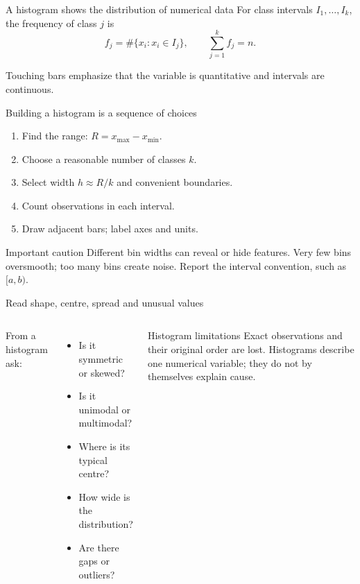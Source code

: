 \documentclass[aspectratio=169,11pt]{beamer}
\begin{document}
\begin{frame}{A histogram shows the distribution of numerical data}
For class intervals $I_1,\ldots,I_k$, the frequency of class $j$ is
\[
f_j=\#\{x_i:x_i\in I_j\}, \qquad \sum_{j=1}^{k}f_j=n.
\]
\begin{center}
\end{center}
Touching bars emphasize that the variable is quantitative and intervals are continuous.
\end{frame}

\begin{frame}{Building a histogram is a sequence of choices}
\begin{enumerate}
  \item Find the range: $R=x_{\max}-x_{\min}$.
  \item Choose a reasonable number of classes $k$.
  \item Select width $h\approx R/k$ and convenient boundaries.
  \item Count observations in each interval.
  \item Draw adjacent bars; label axes and units.
\end{enumerate}
\begin{block}{Important caution}
Different bin widths can reveal or hide features. Very few bins oversmooth; too many bins create noise. Report the interval convention, such as $[a,b)$.
\end{block}
\end{frame}

\begin{frame}{Read shape, centre, spread and unusual values}
\begin{columns}[T]
From a histogram ask:
\begin{itemize}
  \item Is it symmetric or skewed?
  \item Is it unimodal or multimodal?
  \item Where is its typical centre?
  \item How wide is the distribution?
  \item Are there gaps or outliers?
\end{itemize}
\begin{block}{Histogram limitations}
Exact observations and their original order are lost. Histograms describe one numerical variable; they do not by themselves explain cause.
\end{block}
\end{columns}
\end{frame}
\end{document}
